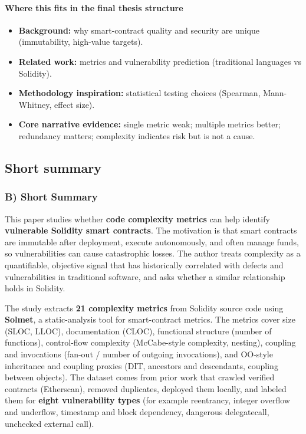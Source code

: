 \documentclass[11pt,a4paper]{article}
\begin{document}
\paragraph{Where this fits in the final thesis structure}
\begin{itemize}[leftmargin=*]
  \item \textbf{Background:} why smart-contract quality and security are unique (immutability, high-value targets).
  \item \textbf{Related work:} metrics and vulnerability prediction (traditional languages vs Solidity).
  \item \textbf{Methodology inspiration:} statistical testing choices (Spearman, Mann-Whitney, effect size).
  \item \textbf{Core narrative evidence:} single metric weak; multiple metrics better; redundancy matters; complexity indicates risk but is not a cause.
\end{itemize}

\subsection{Short summary}
\subsubsection*{B) Short Summary}
This paper studies whether \textbf{code complexity metrics} can help identify \textbf{vulnerable Solidity smart contracts}. The motivation is that smart contracts are immutable after deployment, execute autonomously, and often manage funds, so vulnerabilities can cause catastrophic losses. The author treats complexity as a quantifiable, objective signal that has historically correlated with defects and vulnerabilities in traditional software, and asks whether a similar relationship holds in Solidity.

The study extracts \textbf{21 complexity metrics} from Solidity source code using \textbf{Solmet}, a static-analysis tool for smart-contract metrics. The metrics cover size (SLOC, LLOC), documentation (CLOC), functional structure (number of functions), control-flow complexity (McCabe-style complexity, nesting), coupling and invocations (fan-out / number of outgoing invocations), and OO-style inheritance and coupling proxies (DIT, ancestors and descendants, coupling between objects). The dataset comes from prior work that crawled verified contracts (Etherscan), removed duplicates, deployed them locally, and labeled them for \textbf{eight vulnerability types} (for example reentrancy, integer overflow and underflow, timestamp and block dependency, dangerous delegatecall, unchecked external call).
\end{document}
